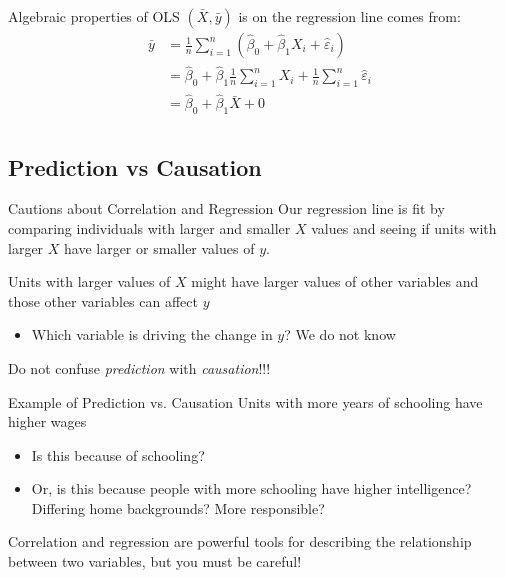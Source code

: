 \documentclass[aspectratio=169,t,11pt,table]{beamer}
\begin{document}
\begin{frame}{Algebraic properties of OLS}
  $(\bar{X}, \bar{y})$ is on the regression line comes from:
  \begin{align*}
    \bar{y} &= \frac{1}{n} \sum_{i=1}^n (\hat{\beta}_0 + \hat{\beta}_1 X_i + \hat{\varepsilon}_i) \\
    &= \hat{\beta}_0 + \hat{\beta}_1 \frac{1}{n} \sum_{i=1}^n X_i + \frac{1}{n} \sum_{i=1}^n \hat{\varepsilon}_i \\
    &= \hat{\beta}_0 + \hat{\beta}_1 \bar{X} + 0 \\
  \end{align*}
\end{frame}

\subsection{Prediction vs Causation}

\begin{frame}{Cautions about Correlation and Regression}
  Our regression line is fit by comparing individuals with larger and smaller $X$ values and seeing if units with larger $X$ have larger or smaller values of $y$. 

  \pause
  \bigskip
  Units with larger values of $X$ might have larger values of other variables and those other variables can affect $y$
  \begin{itemize}
    \item Which variable is driving the change in $y$? We do not know
  \end{itemize}

  Do not confuse \emph{prediction} with \emph{causation}!!! 
\end{frame}

\begin{frame}{Example of Prediction vs. Causation}
  Units with more years of schooling have higher wages
  \begin{itemize}
    \item Is this because of schooling?
    \item Or, is this because people with more schooling have higher intelligence? Differing home backgrounds? More responsible? 
  \end{itemize}

  \pause
  \bigskip\bigskip
  \begin{center}
    Correlation and regression are powerful tools for describing the relationship between two variables, but you must be careful! 
  \end{center}
\end{frame}
\end{document}
